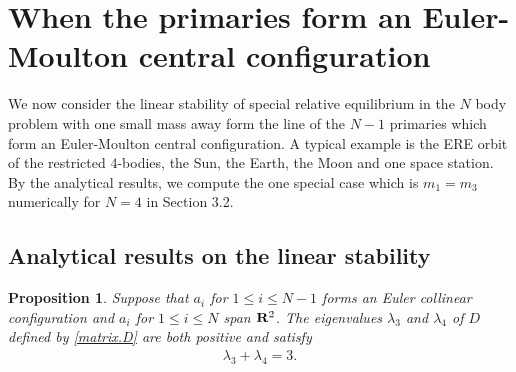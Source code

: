 \documentclass[11pt]{article}
\newtheorem{proposition}[lemma]{Proposition}
\def\R{{\bf R}}
\def\lm{{\lambda}}
\begin{document}
\setcounter{equation}{0}%
\section{When the primaries form an Euler-Moulton central configuration}\label{sec:3}

We now consider the linear stability of special relative equilibrium in the $N$ body problem with one small mass away form the line of the $N-1$ primaries which form an Euler-Moulton central configuration. 
A typical example is the ERE orbit of the restricted
$4$-bodies, the Sun, the Earth, the Moon and one space station. By the analytical results, we compute the one special case which is $m_1 = m_3$ numerically for $N=4$ in Section 3.2.

\subsection{Analytical results on the linear stability}
\begin{proposition}\label{prop.sum.lm3.lm4}
  Suppose that $a_i$ for $1\leq i \leq N-1$ forms an Euler collinear configuration and $a_i$ for $1 \leq i \leq N$ span $\R^2$. The eigenvalues $\lm_3$ and $\lm_4$ of $D$ defined by \eqref{matrix.D} are both positive and satisfy
  \begin{align}
    \lm_3 + \lm_4 = 3.
  \end{align}
\end{proposition}
\end{document}
